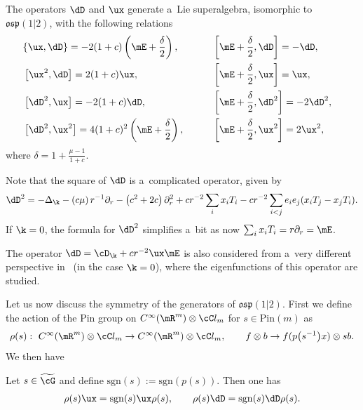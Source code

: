 \begin{theorem}\label{ospFamily}
The operators $\dD$ and $\ux$ generate a~Lie superalgebra, isomorphic to $\mathfrak{osp}(1|2)$,
with the following relations
\begin{alignat*}{3}
& \{\ux,\dD\}=-2(1+c)\left(\mE+\frac{\delta}{2}\right),\qquad&&
\left[\mE+\frac{\delta}{2},\dD\right]=-\dD,& \\
& \left[\ux^{2},\dD\right]=2(1+c)\ux,\qquad&&
\left[\mE+\frac{\delta}{2},\ux\right]=\ux,& \\
& \left[\dD^{2},\ux\right]=-2(1+c)\dD,\qquad&&
\left[\mE+\frac{\delta}{2},\dD^{2}\right]=-2\dD^{2},&\\
& \left[\dD^{2},\ux^{2}\right]=4(1+c)^{2}\left(\mE+\frac{\delta}{2}\right),\qquad&&
\left[\mE+\frac{\delta}{2},\ux^{2}\right]=2\ux^{2},&
\end{alignat*}
where $\delta=1+\frac{\mu-1}{1+c}$.
\end{theorem}

Note that the square of $\dD$ is a~complicated operator, given by
\begin{gather*}
\dD^{2}=-\Delta_{\k}-\left(c\mu\right)r^{-1}\partial_{r}
-\left(c^{2}+2c\right)\partial_{r}^{2}+c r^{-2}\sum_{i}x_{i}T_{i}
-c r^{-2}\sum_{i<j}e_{i}e_{j}(x_{i}T_{j}-x_{j}T_{i}).
\end{gather*}
If $\k=0$, the formula for $\dD^{2}$ simplif\/ies a~bit as now $\sum_{i}x_{i}T_{i}=r
\partial_{r}=\mE$.

\begin{remark}
The operator $\dD=\cD_{\k}+c r^{-2}\ux\mE$ is also considered from a~very dif\/ferent
perspective in~\cite{MR2269930} (in the case $\k=0$), where the eigenfunctions of this operator
are studied.
\end{remark}

Let us now discuss the symmetry of the generators of $\mathfrak{osp}(1|2)$.
First we def\/ine the action of the Pin group on $C^{\infty}(\mR^{m})\otimes\cC l_{m}$ for $s\in
\mathrm{Pin}(m)$ as
\begin{gather*}
\rho(s): \ C^{\infty}(\mR^{m}) \otimes \cC l_{m} \rightarrow C^{\infty}(\mR^{m}) \otimes \cC l_{m},\qquad
 f\otimes b \rightarrow f (p\big(s^{-1}\big)x) \otimes s b.
\end{gather*}
We then have
\begin{proposition}\label{equivarianceG}
Let $s\in\widetilde{\cG}$ and define $\mathrm{sgn}(s):=\mathrm{sgn}(p(s))$.
Then one has
\begin{gather*}
\rho(s) \ux = \mathrm{sgn}(s) \ux \rho(s),\qquad
\rho(s) \dD = \mathrm{sgn}(s) \dD \rho(s).
\end{gather*}
\end{proposition}

